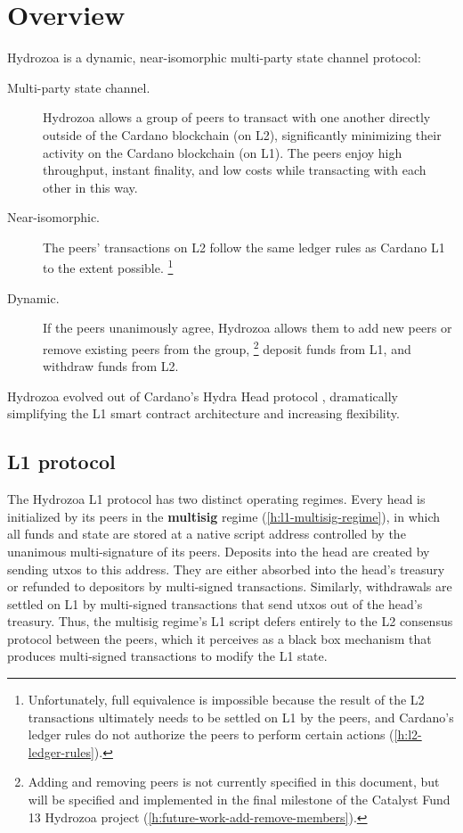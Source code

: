 \documentclass[../hydrozoa.tex]{subfiles}
\begin{document}
\chapter*{Overview}%
\label{h:overview-introduction}%
%

Hydrozoa is a dynamic, near-isomorphic multi-party state channel protocol:
\begin{description}
  \item[Multi-party state channel.] Hydrozoa allows a group of peers to transact with one another directly outside of the Cardano blockchain (on L2), significantly minimizing their activity on the Cardano blockchain (on L1).
    The peers enjoy high throughput, instant finality, and low costs while transacting with each other in this way.
  \item[Near-isomorphic.] The peers' transactions on L2 follow the same ledger rules as Cardano L1 to the extent possible.%
    \footnote{Unfortunately, full equivalence is impossible because the result of the L2 transactions ultimately needs to be settled on L1 by the peers, and Cardano's ledger rules do not authorize the peers to perform certain actions (\cref{h:l2-ledger-rules}).}
  \item[Dynamic.] If the peers unanimously agree, Hydrozoa allows them to add new peers or remove existing peers from the group,%
    \footnote{Adding and removing peers is not currently specified in this document, but will be specified and implemented in the final milestone of the Catalyst Fund 13 Hydrozoa project \citep{FlerovskyCatalystMilestonesHydrozoa2024} (\cref{h:future-work-add-remove-members}).}
    deposit funds from L1, and withdraw funds from L2.
\end{description}
Hydrozoa evolved out of Cardano's Hydra Head protocol \citep{NagelEtAlHydraHeadV1Specification2024}, dramatically simplifying the L1 smart contract architecture and increasing flexibility.

\section*{L1 protocol}%
\label{h:overview-l1-protocol}%
%

The Hydrozoa L1 protocol has two distinct operating regimes.
Every head is initialized by its peers in the \textbf{multisig} regime (\cref{h:l1-multisig-regime}), in which all funds and state are stored at a native script address controlled by the unanimous multi-signature of its peers.
Deposits into the head are created by sending utxos to this address. They are either absorbed into the head's treasury or refunded to depositors by multi-signed transactions.
Similarly, withdrawals are settled on L1 by multi-signed transactions that send utxos out of the head's treasury.
Thus, the multisig regime's L1 script defers entirely to the L2 consensus protocol between the peers, which it perceives as a black box mechanism that produces multi-signed transactions to modify the L1 state.
\end{document}
